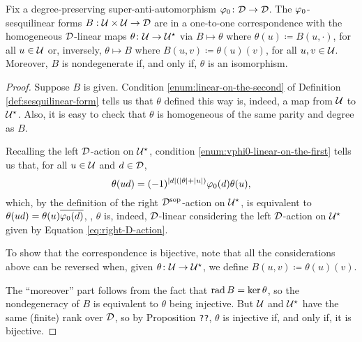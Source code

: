 \begin{prop}\label{prop:sesquilinear-form-iff-D-linear-map}
    Fix a degree-preserving su\-per\--an\-ti\--auto\-mor\-phism $\varphi_0\colon \mathcal{D} \to \mathcal{D}$. 
    The $\varphi_0$-sesquilinear forms $B:\mathcal U\times\mathcal U \to \mathcal{D}$ are in a one-to-one correspondence with the homogeneous $\mathcal{D}$-linear maps $\theta\colon \mathcal U \to \mathcal U^\star$ via $B \mapsto \theta$ where $\theta(u) \coloneqq B(u, \cdot)$, for all $u \in \mathcal U$ or, inversely, $\theta \mapsto B$ where $B(u,v) \coloneqq \theta(u)(v)$, for all $u, v\in \mathcal U$. 
    Moreover, $B$ is nondegenerate if, and only if, $\theta$ is an isomorphism.
\end{prop}

\begin{proof}
    Suppose $B$ is given. Condition \eqref{enum:linear-on-the-second} of Definition \ref{def:sesquilinear-form} tells us that $\theta$ defined this way is, indeed, a map from $\mathcal U$ to $\mathcal U^\star$. 
    Also, it is easy to check that $\theta$ is homogeneous of the same parity and degree as $B$.
    
    Recalling the left $\mathcal{D}$-action on $\mathcal U^\star$, condition \eqref{enum:vphi0-linear-on-the-first} tells us that, for all $u\in \mathcal U$ and $d\in \mathcal{D}$,
    \[
        \theta (ud) = (-1)^{|d|(|\theta|+|u|)}\varphi_0 (d) \theta (u),
    \]
    which, by the definition of the right $\mathcal{D}^{\mathrm{sop}}$-action on $\mathcal U^\star$, is equivalent to $\theta(ud) = \theta(u) \overline{\varphi_0(d)}$, \ie, $\theta$ is, indeed, $\mathcal{D}$-linear considering the left $\mathcal{D}$-action on $\mathcal U^\star$ given by Equation \eqref{eq:right-D-action}.
    
    To show that the correspondence is bijective, note that all the considerations above can be reversed when, given $\theta\colon \mathcal U \to \mathcal U^\star$, we define  $B(u, v) \coloneqq \theta(u)(v)$.
    
    The ``moreover'' part follows from the fact that $\operatorname{rad} B = \ker \theta$, so the nondegeneracy of $B$ is equivalent to $\theta$ being injective. But $\mathcal U$ and $\mathcal U^\star$ have the same (finite) rank over $\mathcal{D}$, so by Proposition {\tt ??}, $\theta$ is injective if, and only if, it is bijective.
\end{proof}


